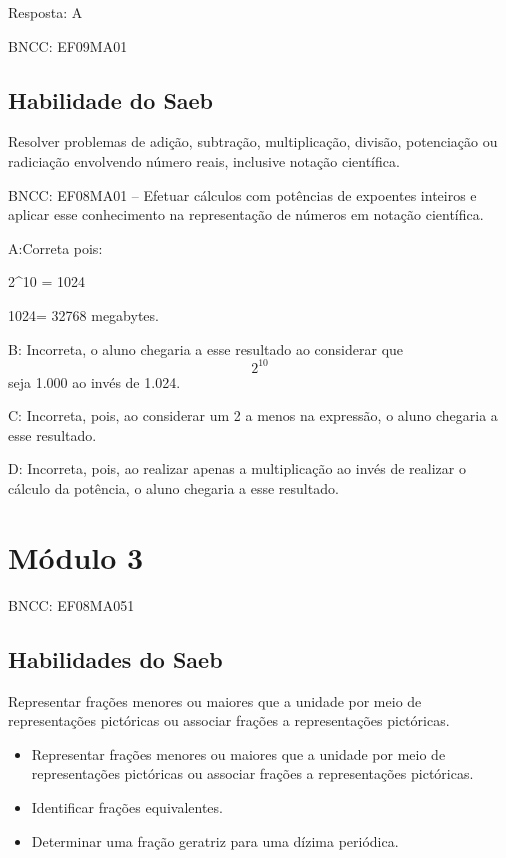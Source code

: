 Resposta: A

BNCC: EF09MA01

\section{Habilidade do Saeb}

Resolver problemas de adição, subtração, multiplicação, divisão,
potenciação ou radiciação envolvendo número reais, inclusive notação
científica.

BNCC: EF08MA01 -- Efetuar cálculos com potências de expoentes inteiros e
aplicar esse conhecimento na representação de números em notação
científica.


A:Correta pois:

2^10 = 1024

1024= 32768 megabytes.

B: Incorreta, o aluno chegaria a esse resultado ao considerar que
\[2^{10}\] seja 1.000 ao invés de 1.024.

C: Incorreta, pois, ao considerar um 2 a menos na expressão, o aluno
chegaria a esse resultado.

D: Incorreta, pois, ao realizar apenas a multiplicação ao invés de
realizar o cálculo da potência, o aluno chegaria a esse resultado.


\chapter{Módulo 3}

BNCC: EF08MA051


\section{Habilidades do Saeb}

Representar frações menores ou maiores que a
unidade por meio de representações pictóricas ou associar frações a
representações pictóricas.

\begin{itemize}

\item 
  Representar frações menores ou maiores que a unidade por meio de
  representações pictóricas ou associar frações a representações
  pictóricas.

\item 
  Identificar frações equivalentes.

\item 
  Determinar uma fração geratriz para uma dízima periódica.
\end{itemize}

